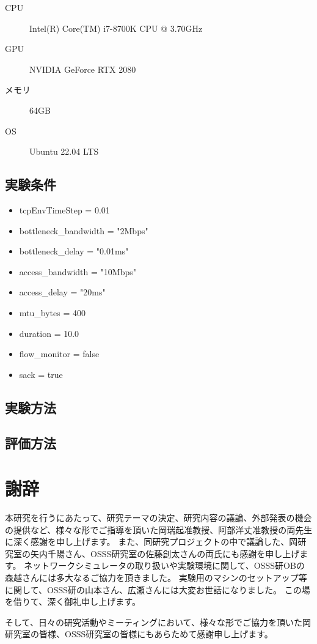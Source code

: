 \documentclass[a4paper,11pt]{jreport}
\begin{document}
\begin{description}
  \item[CPU] Intel(R) Core(TM) i7-8700K CPU @ 3.70GHz
  \item[GPU] NVIDIA GeForce RTX 2080
  \item[メモリ] 64GB
  \item[OS] Ubuntu 22.04 LTS
\end{description}

\section{実験条件}

\begin{itemize}
  \item tcpEnvTimeStep = 0.01
  \item bottleneck\_bandwidth = "2Mbps"
  \item bottleneck\_delay = "0.01ms"
  \item access\_bandwidth = "10Mbps"
  \item access\_delay = "20ms"
  \item mtu\_bytes = 400
  \item duration = 10.0
  \item flow\_monitor = false
  \item sack = true
\end{itemize}


\section{実験方法}

\section{評価方法}

\newpage

\chapter*{謝辞}

本研究を行うにあたって、研究テーマの決定、研究内容の議論、外部発表の機会の提供など、様々な形でご指導を頂いた岡瑞起准教授、阿部洋丈准教授の両先生に深く感謝を申し上げます。
また、同研究プロジェクトの中で議論した、岡研究室の矢内千陽さん、OSSS研究室の佐藤創太さんの両氏にも感謝を申し上げます。
ネットワークシミュレータの取り扱いや実験環境に関して、OSSS研OBの森越さんには多大なるご協力を頂きました。
実験用のマシンのセットアップ等に関して、OSSS研の山本さん、広瀬さんには大変お世話になりました。
この場を借りて、深く御礼申し上げます。

そして、日々の研究活動やミーティングにおいて、様々な形でご協力を頂いた岡研究室の皆様、OSSS研究室の皆様にもあらためて感謝申し上げます。

\newpage

\renewcommand{\bibname}{参考文献}



\end{document}
